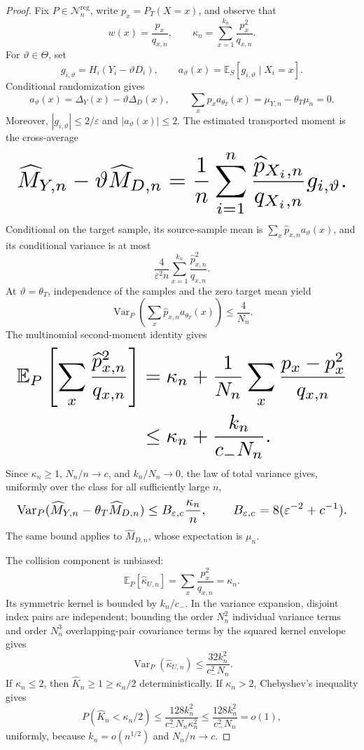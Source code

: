 \documentclass{article}
\begin{document}
\begin{proof}
Fix \(P\in\mathcal N_n^{\mathrm{reg}}\), write \(p_x=P_T(X=x)\), and observe that
\[
 w(x)=\frac{p_x}{q_{x,n}},
 \qquad
 \kappa_n=\sum_{x=1}^{k_n}\frac{p_x^2}{q_{x,n}}.
\]
For \(\vartheta\in\Theta\), set
\[
 g_{i,\vartheta}=H_i(Y_i-\vartheta D_i),
 \qquad
 a_\vartheta(x)=\mathbb E_S[g_{i,\vartheta}\mid X_i=x].
\]
Conditional randomization gives
\[
 a_\vartheta(x)=\Delta_Y(x)-\vartheta\Delta_D(x),
 \qquad
 \sum_xp_xa_{\theta_T}(x)=\mu_{Y,n}-\theta_T\mu_n=0.
\]
Moreover, \(|g_{i,\vartheta}|\le2/\varepsilon\) and \(|a_\vartheta(x)|\le2\). The estimated transported moment is the cross-average
\[
\makebox[\linewidth][c]{\resizebox{0.98\linewidth}{!}{\(\displaystyle \widehat M_{Y,n}-\vartheta\widehat M_{D,n}
 =\frac1n\sum_{i=1}^n
 \frac{\widehat p_{X_i,n}}{q_{X_i,n}}g_{i,\vartheta}.\)}}
\]
Conditional on the target sample, its source-sample mean is \(\sum_x\widehat p_{x,n}a_\vartheta(x)\), and its conditional variance is at most
\[
 \frac4{\varepsilon^2n}
 \sum_{x=1}^{k_n}\frac{\widehat p_{x,n}^2}{q_{x,n}}.
\]
At \(\vartheta=\theta_T\), independence of the samples and the zero target mean yield
\[
 \operatorname{Var}_P\left(\sum_x\widehat p_{x,n}a_{\theta_T}(x)\right)
 \le\frac4{N_n}.
\]
The multinomial second-moment identity gives
\[
\makebox[\linewidth][c]{\resizebox{0.98\linewidth}{!}{\(\displaystyle \begin{aligned}
 \mathbb E_P\left[\sum_x\frac{\widehat p_{x,n}^2}{q_{x,n}}\right]
 &=\kappa_n+\frac1{N_n}\sum_x\frac{p_x-p_x^2}{q_{x,n}}\\
 &\le\kappa_n+\frac{k_n}{c_-N_n}.
 \end{aligned}\)}}
\]
Since \(\kappa_n\ge1\), \(N_n/n\to c\), and \(k_n/N_n\to0\), the law of total variance gives, uniformly over the class for all sufficiently large \(n\),
\[
\makebox[\linewidth][c]{\resizebox{0.98\linewidth}{!}{\(\displaystyle \operatorname{Var}_P(\widehat M_{Y,n}-\theta_T\widehat M_{D,n})
 \le B_{\varepsilon,c}\frac{\kappa_n}{n},
 \qquad
 B_{\varepsilon,c}=8(\varepsilon^{-2}+c^{-1}).\)}}
\]
The same bound applies to \(\widehat M_{D,n}\), whose expectation is \(\mu_n\).

The collision component is unbiased:
\[
 \mathbb E_P[\widehat\kappa_{U,n}]
 =\sum_x\frac{p_x^2}{q_{x,n}}=\kappa_n.
\]
Its symmetric kernel is bounded by \(k_n/c_-\). In the variance expansion, disjoint index pairs are independent; bounding the order \(N_n^2\) individual variance terms and order \(N_n^3\) overlapping-pair covariance terms by the squared kernel envelope gives
\[
 \operatorname{Var}_P(\widehat\kappa_{U,n})
 \le\frac{32k_n^2}{c_-^2N_n}.
\]
If \(\kappa_n\le2\), then \(\widehat K_n\ge1\ge\kappa_n/2\) deterministically. If \(\kappa_n>2\), Chebyshev's inequality gives
\[
 P(\widehat K_n<\kappa_n/2)
 \le\frac{128k_n^2}{c_-^2N_n\kappa_n^2}
 \le\frac{128k_n^2}{c_-^2N_n}=o(1),
\]
uniformly, because \(k_n=o(n^{1/2})\) and \(N_n/n\to c\).


\end{proof}
\end{document}
